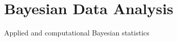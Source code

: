\documentclass{article}
\begin{document}


\section{Bayesian Data Analysis}
Applied and computational Bayesian statistics\\
\end{document}
